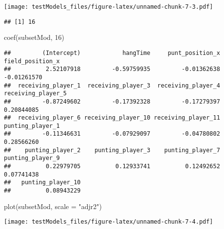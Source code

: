 \documentclass[
]{article}
\newenvironment{Shaded}{\begin{snugshade}}{\end{snugshade}}
\newcommand{\AttributeTok}[1]{\textcolor[rgb]{0.77,0.63,0.00}{#1}}
\newcommand{\DecValTok}[1]{\textcolor[rgb]{0.00,0.00,0.81}{#1}}
\newcommand{\FunctionTok}[1]{\textcolor[rgb]{0.00,0.00,0.00}{#1}}
\newcommand{\NormalTok}[1]{#1}
\newcommand{\SpecialCharTok}[1]{\textcolor[rgb]{0.00,0.00,0.00}{#1}}
\newcommand{\StringTok}[1]{\textcolor[rgb]{0.31,0.60,0.02}{#1}}
\begin{document}
\texttt{[image: testModels\_files/figure-latex/unnamed-chunk-7-3.pdf]}

\begin{Shaded}
\end{Shaded}

\begin{verbatim}
## [1] 16
\end{verbatim}

\begin{Shaded}
\begin{Highlighting}[]
\FunctionTok{coef}\NormalTok{(subsetMod, }\DecValTok{16}\NormalTok{)}
\end{Highlighting}
\end{Shaded}

\begin{verbatim}
##         (Intercept)            hangTime     punt_position_x    field_position_x 
##          2.52107918         -0.59759935         -0.01362638         -0.01261570 
##  receiving_player_1  receiving_player_3  receiving_player_4  receiving_player_5 
##         -0.87249602         -0.17392328         -0.17279397          0.20844085 
##  receiving_player_6 receiving_player_10 receiving_player_11    punting_player_1 
##         -0.11346631         -0.07929097         -0.04780802          0.28566260 
##    punting_player_2    punting_player_3    punting_player_7    punting_player_9 
##          0.22979705          0.12933741          0.12492652          0.07741438 
##   punting_player_10 
##          0.08943229
\end{verbatim}

\begin{Shaded}
\begin{Highlighting}[]
\FunctionTok{plot}\NormalTok{(subsetMod, }\AttributeTok{scale =} \StringTok{"adjr2"}\NormalTok{)}
\end{Highlighting}
\end{Shaded}

\texttt{[image: testModels\_files/figure-latex/unnamed-chunk-7-4.pdf]}
\end{document}
